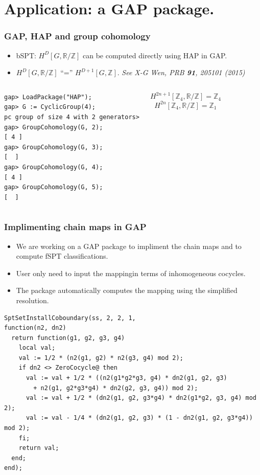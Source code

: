 \documentclass[xcolor=table, aspectratio=169]{beamer}
\newcommand{\uone}{\mathbb R/\mathbb Z}
\begin{document}
\section{Application: a GAP package.}

\begin{frame}[fragile]
	\frametitle{GAP, HAP and group cohomology}
	\begin{itemize}
		\item bSPT: $H^D[G,\uone]$ can be computed directly using HAP in GAP.
		\item $H^D[G,\uone]$ ``='' $H^{D+1}[G,\mathbb Z]$. \emph{See X-G Wen, PRB \textbf{91}, 205101 (2015)}
	\end{itemize}
	\begin{columns}
	\begin{lstlisting}[basicstyle=\footnotesize]
gap> LoadPackage("HAP");
gap> G := CyclicGroup(4);
pc group of size 4 with 2 generators>
gap> GroupCohomology(G, 2);
[ 4 ]
gap> GroupCohomology(G, 3);
[  ]
gap> GroupCohomology(G, 4);
[ 4 ]
gap> GroupCohomology(G, 5);
[  ]
\end{lstlisting}
	\[H^{2n+1}[\mathbb Z_4,\uone] = \mathbb Z_4\]
	\[H^{2n}[\mathbb Z_4,\uone] = \mathbb Z_1\]
	\end{columns}
\end{frame}

\begin{frame}[fragile]
	\frametitle{Implimenting chain maps in GAP}
	\begin{itemize}
		\item We are working on a GAP package to impliment the chain maps and to compute fSPT classifications.
		\item User only need to input the mappingin terms of inhomogeneous cocycles.
		\item The package automatically computes the mapping using the simplified resolution.
	\end{itemize}
\begin{lstlisting}[basicstyle=\footnotesize,morekeywords={function,return,local,if,fi,then,end},showspaces=false,showtabs=false, keywordstyle=\color{blue}]
SptSetInstallCoboundary(ss, 2, 2, 1,
function(n2, dn2)
  return function(g1, g2, g3, g4)
    local val;
    val := 1/2 * (n2(g1, g2) * n2(g3, g4) mod 2);
    if dn2 <> ZeroCocycle@ then
      val := val + 1/2 * ((n2(g1*g2*g3, g4) * dn2(g1, g2, g3)
        + n2(g1, g2*g3*g4) * dn2(g2, g3, g4)) mod 2);
      val := val + 1/2 * (dn2(g1, g2, g3*g4) * dn2(g1*g2, g3, g4) mod 2);
      val := val - 1/4 * (dn2(g1, g2, g3) * (1 - dn2(g1, g2, g3*g4)) mod 2);
    fi;
    return val;
  end;
end);
\end{lstlisting}
\end{frame}
\end{document}
